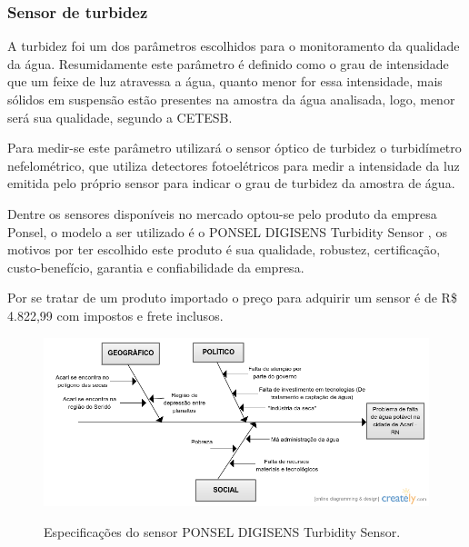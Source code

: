 \subsubsection{Sensor de turbidez}

  A turbidez foi um dos parâmetros escolhidos para o monitoramento da qualidade da água. Resumidamente este parâmetro é definido como o grau de intensidade que um feixe de luz atravessa a água, quanto menor for essa intensidade, mais sólidos em suspensão estão presentes na amostra da água analisada, logo, menor será sua qualidade, segundo a CETESB.
  
  Para medir-se este parâmetro utilizará o sensor óptico de turbidez o turbidímetro nefelométrico, que utiliza detectores fotoelétricos para medir a intensidade da luz emitida pelo próprio sensor para indicar o grau de turbidez da amostra de água.
  
  Dentre os sensores disponíveis no mercado optou-se pelo produto da empresa Ponsel, o modelo a ser utilizado é o PONSEL DIGISENS Turbidity Sensor \footnotemark, os motivos por ter escolhido este produto é sua qualidade, robustez, certificação, custo-benefício, garantia e confiabilidade da empresa.
  
  Por se tratar de um produto importado o preço para adquirir um sensor é de R\$ 4.822,99 com impostos e frete inclusos.
  
  \begin{figure}[!h]
    \centering
    \includegraphics[scale = 0.7, angle = 90]{editaveis/figuras/fishbone}
    \label{fishbone}
    \caption[Especificações do sensor PONSEL DIGISENS Turbidity Sensor]
      {Especificações do sensor PONSEL DIGISENS Turbidity Sensor. \footnotemark}
  \end{figure}
  \FloatBarrier
  